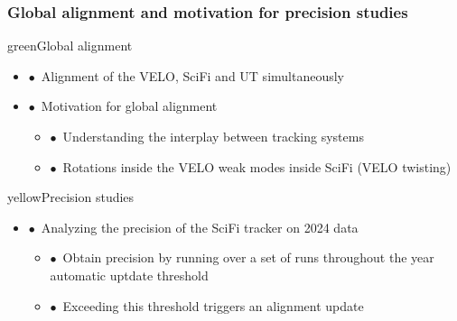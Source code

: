 \documentclass[aspectratio=1610, 12pt, xcolor=dvipsnames]{beamer}
\begin{document}
\begin{frame}\frametitle{Global alignment and motivation for precision studies}
  \begin{mybox}{green}{Global alignment}
    \begin{itemize}
      \item $\bullet$\, Alignment of the VELO, SciFi and UT simultaneously
    \end{itemize}
    \begin{itemize}
      \setlength\itemsep{0em}
      \item $\bullet$\, Motivation for global alignment
      \begin{itemize}
        \item $\bullet$\, Understanding the interplay between tracking systems
        \item $\bullet$\, Rotations inside the VELO \to weak modes inside SciFi (VELO twisting)
      \end{itemize}
    \end{itemize}
  \end{mybox}
  \begin{mybox}{yellow}{Precision studies}
    \begin{itemize}
      \item $\bullet$\, Analyzing the precision of the SciFi tracker on 2024 data
      \begin{itemize}
        \setlength\itemsep{0em}
        \item $\bullet$\, Obtain precision by running over a set of runs throughout the year \to automatic uptdate threshold 
        \item $\bullet$\, Exceeding this threshold triggers an alignment update
      \end{itemize}
    \end{itemize}
  \end{mybox}
\end{frame}
\end{document}
